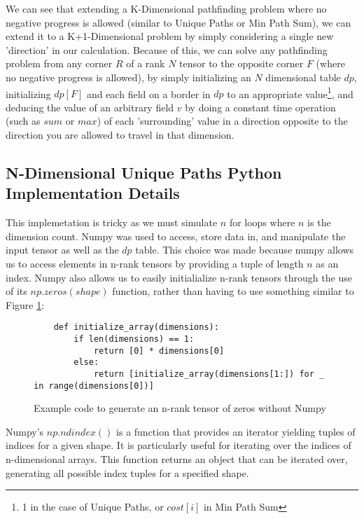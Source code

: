 We can see that extending a K-Dimensional pathfinding problem where no negative progress is allowed (similar to Unique Paths or Min Path Sum),
we can extend it to a K+1-Dimensional problem by simply considering a single new 'direction' in our calculation.
Because of this, we can solve any pathfinding problem from any corner $R$ of a rank $N$ tensor to the opposite corner $F$ (where no negative progress is allowed),
by simply initializing an $N$ dimensional table $dp$, initializing $dp[F]$ and each field on a border in $dp$ to an appropriate value\footnote{1 in the case of Unique Paths, or $cost[i]$ in Min Path Sum}, and deducing the value of an arbitrary field $v$ by doing a constant time operation (such as $sum$ or $max$) of each 'surrounding' value in a direction opposite to the direction you are allowed to travel in that dimension.


\subsection{N-Dimensional Unique Paths Python Implementation Details}
This implemetation is tricky as we must simulate $n$ for loops where $n$ is the dimension count.
Numpy was used to access, store data in, and manipulate the input tensor as well as the $dp$ table.
This choice was made because numpy allows us to access elements in n-rank tensors by providing a tuple of length $n$ as an index.
Numpy also allows us to easily initialialize n-rank tensors through the use of its $np.zeros(shape)$ function, rather than having to use something similar to Figure \ref{fig:zeros}:

\begin{figure}[H]
    \centering
    \begin{lstlisting}
    def initialize_array(dimensions):
        if len(dimensions) == 1:
            return [0] * dimensions[0]
        else:
            return [initialize_array(dimensions[1:]) for _ in range(dimensions[0])]
    \end{lstlisting}
    \caption{Example code to generate an n-rank tensor of zeros without Numpy}
    \label{fig:zeros}
\end{figure}

Numpy's $np.ndindex()$ is a function that provides an iterator yielding tuples of indices for a given shape.
It is particularly useful for iterating over the indices of n-dimensional arrays.
This function returns an object that can be iterated over, generating all possible index tuples for a specified shape.

